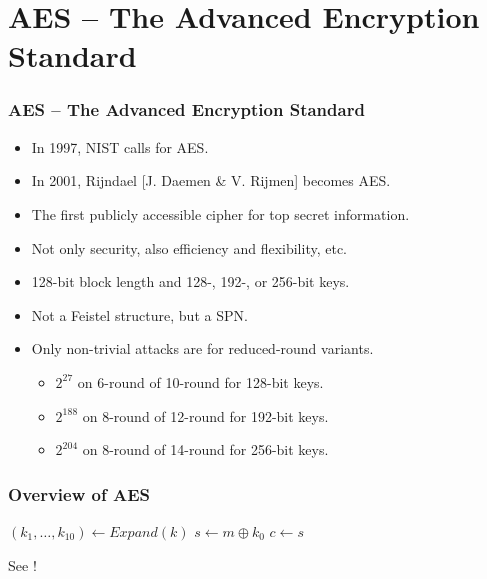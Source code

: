 \section{AES -- The Advanced Encryption Standard}
\begin{frame}\frametitle{AES -- The Advanced Encryption Standard}
\begin{itemize}
\item In 1997, NIST calls for AES.
\item In 2001, Rijndael [J. Daemen \& V. Rijmen] becomes AES.
\item The first publicly accessible cipher for top secret information.
\item Not only security, also efficiency and flexibility, etc.
\item 128-bit block length and 128-, 192-, or 256-bit keys.
\item Not a Feistel structure, but a SPN.
\item Only non-trivial attacks are for reduced-round variants.
\begin{itemize}
\item $2^{27}$ on 6-round of 10-round for 128-bit keys.
\item $2^{188}$ on 8-round of 12-round for 192-bit keys.
\item $2^{204}$ on 8-round of 14-round for 256-bit keys. 
\end{itemize}
\end{itemize}
\end{frame}
\begin{frame}\frametitle{Overview of AES}
\begin{algorithm}[H]
\DontPrintSemicolon
\caption{$\mathsf{AES}$}
\BlankLine
$(k_{1},\dots,k_{10}) \gets Expand(k)$\;
$s \gets m\oplus k_{0}$\;
\Return $c \gets s$\;
\end{algorithm}
See \href{https://formaestudio.com/rijndaelinspector/archivos/Rijndael_Animation_v4_eng-html5.html}{}!
\end{frame}
